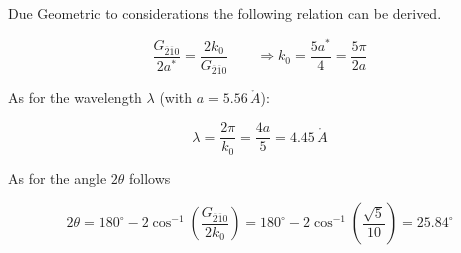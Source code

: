 Due Geometric to considerations the following relation can be derived.

$$\frac{G_{\overline{2}\overline{1}0}}{2a^*} = \frac{2 k_0}{G_{\overline{2}\overline{1}0}} \qquad \Rightarrow k_0 = \frac{5a^*}{4} = \frac{5\pi}{2a}$$

As for the wavelength $\lambda$  (with $a = 5.56 \, \mathring{A}$):

$$\lambda = \frac{2\pi}{k_0} = \frac{4a}{5} = 4.45  \, \mathring{A}$$

As for the angle $2\theta$ follows

$$2\theta = 180^\circ - 2 \cos^{-1} \left( \frac{G_{\overline{2}\overline{1}0}}{2k_0} \right) =
    180^\circ - 2 \cos^{-1} \left( \frac{\sqrt{5}}{10} \right) = 25.84 ^\circ$$